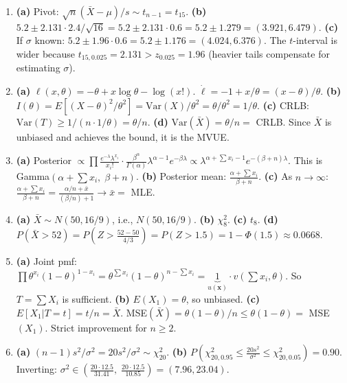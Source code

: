 \documentclass[11pt]{article}
\begin{document}
\begin{enumerate}[start=41]
\item \textbf{(a)} Pivot: $\sqrt{n}(\bar X - \mu)/s \sim t_{n-1} = t_{15}$. \textbf{(b)} $5.2 \pm 2.131 \cdot 2.4/\sqrt{16} = 5.2 \pm 2.131 \cdot 0.6 = 5.2 \pm 1.279 = (3.921, 6.479)$. \textbf{(c)} If $\sigma$ known: $5.2 \pm 1.96 \cdot 0.6 = 5.2 \pm 1.176 = (4.024, 6.376)$. The $t$-interval is wider because $t_{15,0.025} = 2.131 > z_{0.025} = 1.96$ (heavier tails compensate for estimating $\sigma$).

\item \textbf{(a)} $\ell(x,\theta) = -\theta + x\log\theta - \log(x!)$. $\dot\ell = -1 + x/\theta = (x-\theta)/\theta$. \textbf{(b)} $I(\theta) = E[(X-\theta)^2/\theta^2] = \text{Var}(X)/\theta^2 = \theta/\theta^2 = 1/\theta$. \textbf{(c)} CRLB: $\text{Var}(T) \ge 1/(n\cdot 1/\theta) = \theta/n$. \textbf{(d)} $\text{Var}(\bar X) = \theta/n = $ CRLB. Since $\bar X$ is unbiased and achieves the bound, it is the MVUE.

\item \textbf{(a)} Posterior $\propto \prod \frac{e^{-\lambda}\lambda^{x_i}}{x_i!} \cdot \frac{\beta^\alpha}{\Gamma(\alpha)}\lambda^{\alpha-1}e^{-\beta\lambda} \propto \lambda^{\alpha + \sum x_i - 1}e^{-(\beta+n)\lambda}$. This is Gamma$(\alpha + \sum x_i, \;\beta + n)$. \textbf{(b)} Posterior mean: $\frac{\alpha + \sum x_i}{\beta + n}$. \textbf{(c)} As $n \to \infty$: $\frac{\alpha + \sum x_i}{\beta + n} = \frac{\alpha/n + \bar x}{(\beta/n) + 1} \to \bar x = $ MLE.

\item \textbf{(a)} $\bar X \sim N(50, 16/9)$, i.e., $N(50, 16/9)$. \textbf{(b)} $\chi^2_8$. \textbf{(c)} $t_8$. \textbf{(d)} $P(\bar X > 52) = P\!\left(Z > \frac{52-50}{4/3}\right) = P(Z > 1.5) = 1 - \Phi(1.5) \approx 0.0668$.

\item \textbf{(a)} Joint pmf: $\prod \theta^{x_i}(1-\theta)^{1-x_i} = \theta^{\sum x_i}(1-\theta)^{n - \sum x_i} = \underbrace{1}_{u(\mathbf{x})}\cdot v(\sum x_i, \theta)$. So $T = \sum X_i$ is sufficient. \textbf{(b)} $E(X_1) = \theta$, so unbiased. \textbf{(c)} $E[X_1|T=t] = t/n = \bar X$. MSE$(\bar X) = \theta(1-\theta)/n \le \theta(1-\theta) = $ MSE$(X_1)$. Strict improvement for $n \ge 2$.

\item \textbf{(a)} $(n-1)s^2/\sigma^2 = 20s^2/\sigma^2 \sim \chi^2_{20}$. \textbf{(b)} $P\!\left(\chi^2_{20,0.95} \le \frac{20s^2}{\sigma^2} \le \chi^2_{20,0.05}\right) = 0.90$. Inverting: $\sigma^2 \in \left(\frac{20 \cdot 12.5}{31.41},\; \frac{20 \cdot 12.5}{10.85}\right) = (7.96, 23.04)$.


\end{enumerate}
\end{document}
